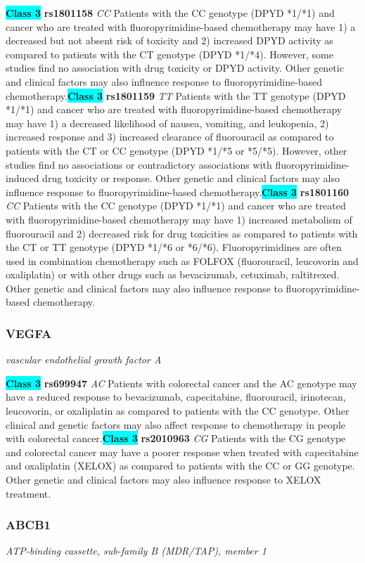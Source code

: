 \documentclass{report}
\begin{document}
\textbf{\colorbox{cyan} {Class 3}} \textbf{ rs1801158 } \textit{ CC }
Patients with the CC genotype (DPYD *1/*1) and cancer who are treated with fluoropyrimidine-based chemotherapy may have 1) a decreased but not absent risk of toxicity and 2) increased DPYD activity as compared to patients with the CT genotype (DPYD *1/*4). However, some studies find no association with drug toxicity or DPYD activity. Other genetic and clinical factors may also influence response to fluoropyrimidine-based chemotherapy.\newline\textbf{\colorbox{cyan} {Class 3}} \textbf{ rs1801159 } \textit{ TT }
Patients with the TT genotype (DPYD *1/*1) and cancer who are treated with fluoropyrimidine-based chemotherapy may have 1) a decreased likelihood of nausea, vomiting, and leukopenia, 2) increased response and 3) increased clearance of fluorouracil as compared to patients with the CT or CC genotype (DPYD *1/*5 or *5/*5). However, other studies find no associations or contradictory associations with fluoropyrimidine-induced drug toxicity or response. Other genetic and clinical factors may also influence response to fluoropyrimidine-based chemotherapy.\newline\textbf{\colorbox{cyan} {Class 3}} \textbf{ rs1801160 } \textit{ CC }
Patients with the CC genotype (DPYD *1/*1) and cancer who are treated with fluoropyrimidine-based chemotherapy may have 1) increased metabolism of fluorouracil and 2) decreased risk for drug toxicities as compared to patients with the CT or TT genotype (DPYD *1/*6 or *6/*6). Fluoropyrimidines are often used in combination chemotherapy such as FOLFOX (fluorouracil, leucovorin and oxaliplatin) or with other drugs such as bevacizumab, cetuximab, raltitrexed. Other genetic and clinical factors may also influence response to fluoropyrimidine-based chemotherapy.\newline\subsubsection{ VEGFA }
\textit{ vascular endothelial growth factor A }

\textbf{\colorbox{cyan} {Class 3}} \textbf{ rs699947 } \textit{ AC }
Patients with colorectal cancer and the AC genotype may have a reduced response to bevacizumab, capecitabine, fluorouracil, irinotecan, leucovorin, or oxaliplatin as compared to patients with the CC genotype. Other clinical and genetic factors may also affect response to chemotherapy in people with colorectal cancer.\newline\textbf{\colorbox{cyan} {Class 3}} \textbf{ rs2010963 } \textit{ CG }
Patients with the CG genotype and colorectal cancer may have a poorer response when treated with capecitabine and oxaliplatin (XELOX) as compared to patients with the CC or GG genotype. Other genetic and clinical factors may also influence response to XELOX treatment.\newline\subsubsection{ ABCB1 }
\textit{ ATP-binding cassette, sub-family B (MDR/TAP), member 1 }
\end{document}
